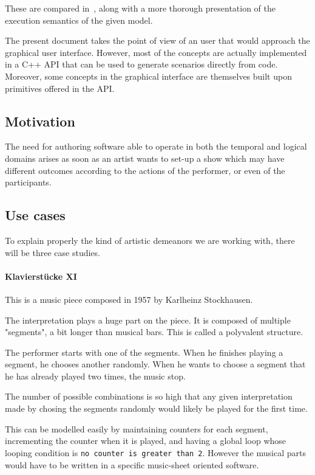 \documentclass{sigchi}
\begin{document}
These are compared in~\cite{celerier2015ossia}, along with a more thorough presentation of the execution semantics of the given model.

The present document takes the point of view of an user that would approach the graphical user interface. However, most of the concepts are actually implemented in a C++ API\cite{hogue2014ossia} that can be used to generate scenarios directly from code. Moreover, some concepts in the graphical interface are themselves built upon primitives offered in the API.

\subsection{Motivation}
The need for authoring software able to operate in both the temporal and logical domains arises as soon as an artist wants to set-up a show which may have different outcomes according to the actions of the performer, or even of the participants.

\subsection{Use cases}
To explain properly the kind of artistic demeanors we are working with, there will be three case studies.

\paragraph{Klavierstücke XI}
This is a music piece composed in 1957 by Karlheinz Stockhausen.

The interpretation plays a huge part on the piece. It is composed of multiple "segments", a bit longer than musical bars. This is called a polyvalent structure.

The performer starts with one of the segments. When he finishes playing a segment, he chooses another randomly. When he wants to choose a segment that he has already played two times, the music stop.

The number of possible combinations is so high that any given interpretation made by chosing the segments randomly would likely be played for the first time.

This can be modelled easily by maintaining counters for each segment, incrementing the counter when it is played, and having a global loop whose looping condition is \texttt{no counter is greater than 2}. However the musical parts would have to be written in a specific music-sheet oriented software.
\end{document}
